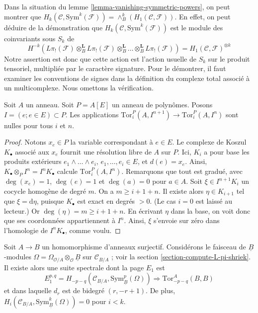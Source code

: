 \begin{remark}
\label{remark-first-homology-symmetric-power}
Dans la situation du lemme \ref{lemma-vanishing-symmetric-powers}, on peut
montrer que
$H_k(\mathcal{C}, \text{Sym}^k(\mathcal{F})) =
\wedge^k_B(H_1(\mathcal{C}, \mathcal{F}))$.
En effet, on peut déduire de la démonstration que
$H_k(\mathcal{C}, \text{Sym}^k(\mathcal{F}))$ est le module des coinvariants
sous $S_k$ de
$$
H^{-k}(L\pi_!(\mathcal{F}) \otimes_B^\mathbf{L}
L\pi_!(\mathcal{F}) \otimes_B^\mathbf{L}
\ldots \otimes_B^\mathbf{L} L\pi_!(\mathcal{F})) =
H_1(\mathcal{C}, \mathcal{F})^{\otimes k}
$$
Notre assertion est donc que cette action est l'action usuelle de $S_k$ sur le
produit tensoriel, multipliée par le caractère signature. Pour le démontrer,
il faut examiner les conventions de signes dans la définition du complexe
total associé à un multicomplexe. Nous omettons la vérification.
\end{remark}

\begin{lemma}
\label{lemma-map-tors-zero}
Soit $A$ un anneau. Soit $P = A[E]$ un anneau de polynômes. Posons
$I = (e; e \in E) \subset P$. Les applications
$\text{Tor}_i^P(A, I^{n + 1}) \to \text{Tor}_i^P(A, I^n)$
sont nulles pour tous $i$ et $n$.
\end{lemma}

\begin{proof}
Notons $x_e \in P$ la variable correspondant à $e \in E$. Le complexe de
Koszul $K_\bullet$ associé aux $x_e$ fournit une résolution libre de $A$ sur
$P$. Ici, $K_i$ a pour base les produits extérieurs
$e_1 \wedge \ldots \wedge e_i$, $e_1, \ldots, e_i \in E$, et $d(e) = x_e$.
Ainsi, $K_\bullet \otimes_P I^n = I^nK_\bullet$ calcule
$\text{Tor}_i^P(A, I^n)$. Remarquons que tout est gradué, avec
$\deg(x_e) = 1$, $\deg(e) = 1$ et $\deg(a) = 0$ pour $a \in A$. Soit
$\xi \in I^{n + 1}K_i$ un cocycle homogène de degré $m$. On a
$m \geq i + 1 + n$. Il existe alors $\eta \in K_{i + 1}$ tel que
$\xi = \text{d}\eta$, puisque $K_\bullet$ est exact en degrés $ > 0$. (Le cas
$i = 0$ est laissé au lecteur.) Or $\deg(\eta) = m \geq i + 1 + n$. En
écrivant $\eta$ dans la base, on voit donc que ses coordonnées appartiennent à
$I^n$. Ainsi, $\xi$ s'envoie sur zéro dans l'homologie de $I^nK_\bullet$,
comme voulu.
\end{proof}

\begin{theorem}
\label{theorem-quillen-spectral-sequence}
Soit $A \to B$ un homomorphisme d'anneaux surjectif. Considérons le faisceau
de $\underline{B}$-modules
$\Omega = \Omega_{\mathcal{O}/A} \otimes_\mathcal{O} \underline{B}$ sur
$\mathcal{C}_{B/A}$ ; voir la section \ref{section-compute-L-pi-shriek}. Il
existe alors une suite spectrale dont la page $E_1$ est
$$
E_1^{p, q} =
H_{- p - q}(\mathcal{C}_{B/A}, \text{Sym}^p_{\underline{B}}(\Omega))
\Rightarrow \text{Tor}^A_{- p - q}(B, B)
$$
et dans laquelle $d_r$ est de bidegré $(r, -r + 1)$. De plus,
$H_i(\mathcal{C}_{B/A}, \text{Sym}^k_{\underline{B}}(\Omega)) = 0$ pour
$i < k$.
\end{theorem}

